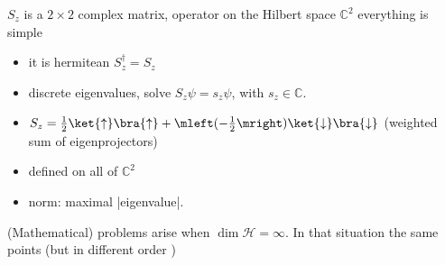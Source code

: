 \documentclass[12pt]{article}
\numberwithin{equation}{section}
\theoremstyle{plain}
\theoremstyle{plain}
\begin{document}
$S_z$ is a $2\times 2$ complex matrix, operator on the Hilbert space $\mathbb{C}^2$ everything is simple
\begin{itemize}
	\item it is hermitean $S_z^\dagger = S_z$
	\item discrete eigenvalues, solve $S_z \psi = s_z \psi$, with $s_z \in \mathbb{C}$.
	\item $S_z = \frac{1}{2} \ket{\uparrow}\bra{\uparrow} + \mleft(- \frac{1}{2} \mright) \ket{\downarrow} \bra{\downarrow}$ (weighted sum of eigenprojectors)
	\item defined on all of $\mathbb{C}^2$
	\item norm: maximal |eigenvalue|.
\end{itemize}

(Mathematical) problems arise when $\dim \mathcal H = \infty$. In that situation the same points (but in different order )
\end{document}
